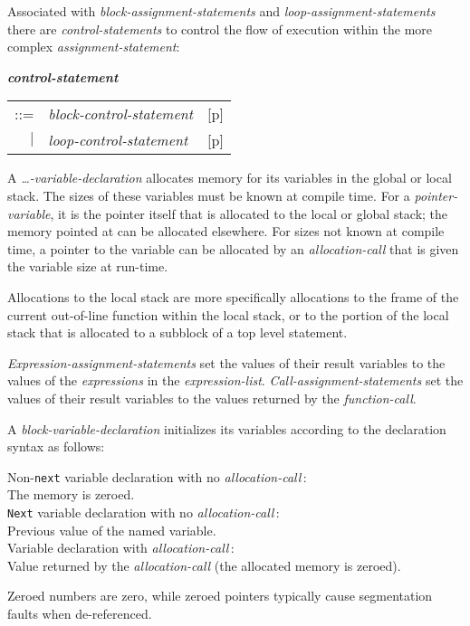 \documentclass[12pt]{article}
\newcommand{\emkey}[1]{{\em \bfseries #1}}
\newcommand{\pagref}[1]{p\pageref{#1}}
\newenvironment{indpar}[1][0.3in]%
	{\begin{list}{}%
		     {\setlength{\itemsep}{0in}%
		      \setlength{\topsep}{0in}%
		      \setlength{\parsep}{1ex}%
		      \setlength{\labelwidth}{#1}%
		      \setlength{\leftmargin}{#1}%
		      \addtolength{\leftmargin}{\labelsep}}%
	 \item}%
	{\end{list}}
\begin{document}
Associated with {\em block-assignment-statements} and
{\em loop-assignment-statements}
there are {\em con\-trol-statements}
to control the flow of execution within the more complex
{\em assignment-state\-ment}:
\begin{indpar}
\emkey{control-statement}\label{CONTROL-STATEMENT}
    \begin{tabular}[t]{@{}rll}
    ::= & {\em block-control-statement}
        & [\pagref{BLOCK-CONTROL-STATEMENT}] \\
    $|$ & {\em loop-control-statement}
        & [\pagref{LOOP-CONTROL-STATEMENT}] \\
    \end{tabular}
\end{indpar}

A {\em \ldots-variable-declaration}\label{VARIABLE-ALLOCATION}
allocates memory for its variables in the global or local stack.
The sizes of these variables must be known at compile time.
For a {\em pointer-variable}, it is the pointer itself that is
allocated to the local or global stack; the
memory pointed at can be allocated elsewhere.
For sizes not known at compile time, a pointer to the variable
can be allocated by an {\em allocation-call} that is given the variable
size at run-time.

Allocations to the local stack are more specifically allocations to the
frame of the current out-of-line function within the local stack,
or to the portion of the local stack that is allocated to
a subblock of a top level statement.

{\em Expression-assignment-statements} set the values of their result variables
to the values of the {\em expressions} in the {\em expression-list}.
{\em Call-assignment-statements} set the values of their result variables
to the values returned by the {\em function-call}.

A {\em block-variable-declaration}\label{VARIABLE-INITIALIZATION}
initializes its variables
according to the declaration syntax as follows:
\begin{indpar}[0.05in]
Non-{\tt next} variable declaration with no {\em allocation-call}\,: \\
\hspace*{3em}The memory is zeroed. \\
{\tt Next} variable declaration with no {\em allocation-call}\,: \\
\hspace*{3em}Previous value of the named variable. \\
Variable declaration with {\em allocation-call}\,: \\
\hspace*{3em}Value returned by the {\em allocation-call}
             (the allocated memory is zeroed).
\end{indpar}
Zeroed numbers are zero, while zeroed pointers typically
cause segmentation faults when de-referenced.
\end{document}
